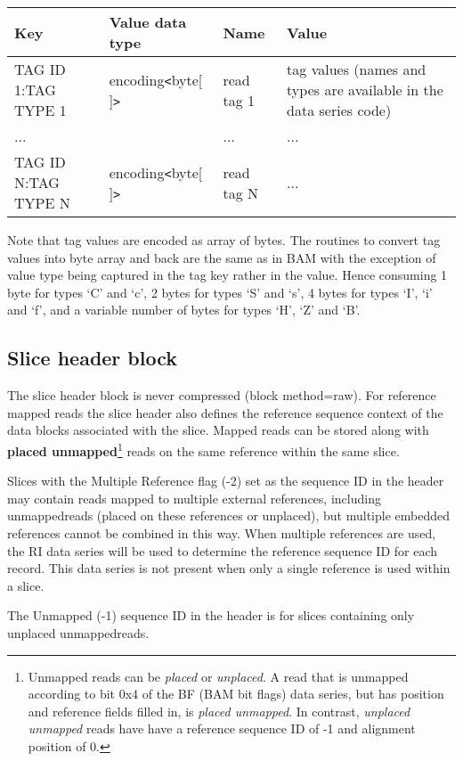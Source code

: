 \documentclass[a4paper]{article}
\begin{document}
\begin{tabular}{|l|l|l|>{\raggedright}p{160pt}|}
\hline
\textbf{Key} & \textbf{Value data type} & \textbf{Name} & \textbf{Value}
\tabularnewline
\hline
TAG ID 1:TAG TYPE 1 & encoding\texttt{<}byte[ ]\texttt{>} & read tag 1 & tag values
(names and types are available in the data series code)\tabularnewline
\hline
... &  & ... & ...\tabularnewline
\hline
TAG ID N:TAG TYPE N & encoding\texttt{<}byte[ ]\texttt{>} & read tag N & ...\tabularnewline
\hline
\end{tabular}

Note that tag values are encoded as array of bytes. The routines to convert tag 
values into byte array and back are the same as in BAM with the exception of value 
type being captured in the tag key rather in the value.
Hence consuming 1 byte for types `C' and `c', 2 bytes for types `S' and `s', 4 bytes for types `I', `i' and `f', and a variable number of bytes for types `H', `Z' and `B'.

\subsection{Slice header block}

The slice header block is never compressed (block method=raw). For reference mapped 
reads the slice header also defines the reference sequence context of the data 
blocks associated with the slice. Mapped reads can be stored along with
\textbf{placed unmapped}\footnote{Unmapped reads can be \textit{placed} or \textit{unplaced}.
A read that is unmapped according to bit 0x4 of the BF (BAM bit flags)
data series, but has position and reference fields filled in, is
\textit{placed unmapped}.  In contrast, \textit{unplaced unmapped}
reads have have a reference sequence ID of -1 and alignment position of 0.}
reads on the same reference within the same slice.

Slices with the Multiple Reference flag (-2) set as the sequence ID in the header may contain reads
mapped to multiple external references, including unmapped\footnotemark[\value{footnote}] reads (placed on these references or unplaced),
but multiple embedded references cannot be combined in this way.  When multiple references are
used, the RI data series will be used to determine the reference sequence ID for each record.  This
data series is not present when only a single reference is used within a slice.

The Unmapped (-1) sequence ID in the header is for slices containing only unplaced
unmapped\footnotemark[\value{footnote}] reads.
\end{document}
